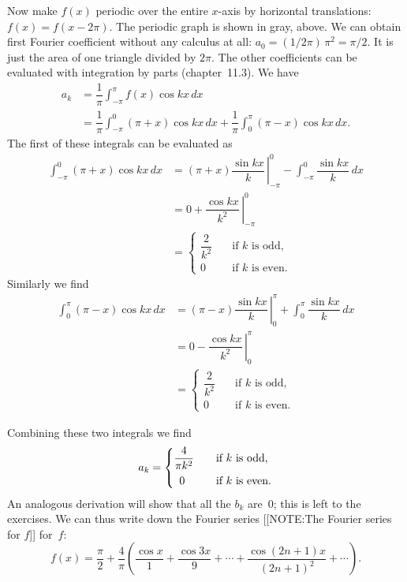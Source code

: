 Now make $f(x)$ periodic over the entire $x$-axis by horizontal
translations: $f(x) = f(x - 2\pi)$. The periodic graph is shown in
gray, above.  We can obtain first Fourier coefficient without any
calculus at all: $a_0=(1/2\pi)\,\pi^2=\pi/2$. It is just the area of
one triangle divided by $2\pi$.  The other coefficients can be
evaluated with integration by parts (chapter~11.3).  We
have
\begin{align*}
a_k &= \dfrac{1}{\pi}\int_{-\pi}^{\pi} f(x) \cos{kx} \, dx \\
    &= \dfrac{1}{\pi}\int_{-\pi}^0 (\pi+x) \cos{kx} \, dx 
         + \dfrac{1}{\pi}\int_0^{\pi}(\pi-x) \cos{kx} \, dx.
   \end{align*}
The first of these integrals can be evaluated as
\begin{align*}
\int_{-\pi}^0 (\pi+x)\cos{kx}\, dx  
  &= \left.(\pi+x)\dfrac{\sin{kx}}{k}\, \right|_{-\pi}^0
       - \int_{-\pi}^0 \dfrac{\sin{kx}}{k}\, dx \\
  &= 0 + \left.\dfrac{\cos{kx}}{k^2}\, \right|_{-\pi}^0 \\
  &= \begin{cases}
\dfrac{2}{k^2} & \quad\text{if $k$ is odd}, \\[6pt]
0  & \quad\text{if $k$ is even}.
     \end{cases}
\end{align*}
Similarly we find
\begin{align*}
\int_0^{\pi}(\pi-x)\cos{kx} \, dx  
  &= \left.(\pi-x)\dfrac{\sin{kx}}{k}\, \right|_0^{\pi}
      + \int_0^{\pi} \dfrac{\sin{kx}}{k}\, dx \\
  &= 0 - \left.\dfrac{\cos{kx}}{k^2}\, \right|_0^{\pi} \\
  &=\begin{cases}
\dfrac{2}{k^2} & \quad\text{if $k$ is odd}, \\[6pt]
0  & \quad\text{if $k$ is even}.
\end{cases}
\end{align*}

Combining these two integrals we find
\[
a_k = \begin{cases}
\dfrac{4}{\pi k^2} & \quad\text{if $k$ is odd}, \\[6pt]
\hphantom{0}0  & \quad\text{if $k$ is even}.
\end{cases}
\]
An analogous derivation will show that all the $b_k$ are~0; this is
left to the exercises. We can thus write down the Fourier series
[[NOTE:The Fourier series for $f$]]
for~$f$: 
\[
f(x) = \dfrac{\pi}{2} +\dfrac{4}{\pi}\left(\dfrac{\cos{x}}{1} 
        + \dfrac{\cos{3x}}{9} + \cdots 
        +\dfrac{\cos{(2n+1)x}}{(2n+1)^2} + \cdots \right). 
\]

